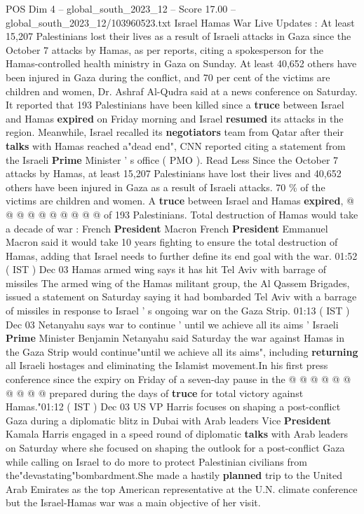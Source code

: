 \begin{textsample}{POS Dim 4 – global\_south\_2023\_12 – Score 17.00 – global\_south\_2023\_12/103960523.txt}  \label{ex:f4_pos_150}
Israel Hamas War Live Updates : At least 15,207 Palestinians lost their lives as a result of Israeli attacks in Gaza since the October 7 attacks by Hamas, as per reports, citing a spokesperson for the Hamas-controlled health ministry in Gaza on Sunday.
At least 40,652 others have been injured in Gaza during the conflict, and 70 per cent of the victims are children and women, Dr.
Ashraf Al-Qudra said at a news conference on Saturday.
It reported that 193 Palestinians have been killed since a \textbf{truce} between Israel and Hamas \textbf{expired} on Friday morning and Israel \textbf{resumed} its attacks in the region.
Meanwhile, Israel recalled its \textbf{negotiators} team from Qatar after their \textbf{talks} with Hamas reached a"dead end", CNN reported citing a statement from the Israeli \textbf{Prime} Minister ' s office ( PMO ).
Read Less Since the October 7 attacks by Hamas, at least 15,207 Palestinians have lost their lives and 40,652 others have been injured in Gaza as a result of Israeli attacks. 70 \% of the victims are children and women.
A \textbf{truce} between Israel and Hamas \textbf{expired}, @ @ @ @ @ @ @ @ @ @ of 193 Palestinians.
Total destruction of Hamas would take a decade of war : French \textbf{President} Macron French \textbf{President} Emmanuel Macron said it would take 10 years fighting to ensure the total destruction of Hamas, adding that Israel needs to further define its end goal with the war. 01:52 ( IST ) Dec 03 Hamas armed wing says it has hit Tel Aviv with barrage of missiles The armed wing of the Hamas militant group, the Al Qassem Brigades, issued a statement on Saturday saying it had bombarded Tel Aviv with a barrage of missiles in response to Israel ' s ongoing war on the Gaza Strip. 01:13 ( IST ) Dec 03 Netanyahu says war to continue ' until we achieve all its aims ' Israeli \textbf{Prime} Minister Benjamin Netanyahu said Saturday the war against Hamas in the Gaza Strip would continue"until we achieve all its aims", including \textbf{returning} all Israeli hostages and eliminating the Islamist movement.In his first press conference since the expiry on Friday of a seven-day pause in the @ @ @ @ @ @ @ @ @ @ prepared during the days of \textbf{truce} for total victory against Hamas."01:12 ( IST ) Dec 03 US VP Harris focuses on shaping a post-conflict Gaza during a diplomatic blitz in Dubai with Arab leaders Vice \textbf{President} Kamala Harris engaged in a speed round of diplomatic \textbf{talks} with Arab leaders on Saturday where she focused on shaping the outlook for a post-conflict Gaza while calling on Israel to do more to protect Palestinian civilians from the"devastating"bombardment.She made a hastily \textbf{planned} trip to the United Arab Emirates as the top American representative at the U.N. climate conference but the Israel-Hamas war was a main objective of her visit.

\end{textsample}
